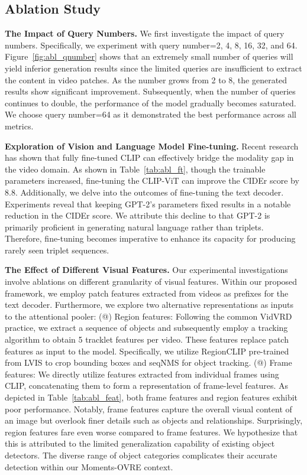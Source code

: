 \documentclass[letterpaper]{article}
\makeatletter
\newcommand{\Rmnum}[1]{\expandafter\@slowromancap\romannumeral #1@}
\makeatother
\begin{document}
\subsection{Ablation Study}
\noindent \textbf{The Impact of Query Numbers. }
We first investigate the impact of query numbers.
Specifically, we experiment with query number=2, 4, 8, 16, 32, and 64.
Figure~\ref{fig:abl_qnumber} shows that an extremely small number of queries will yield inferior generation results since the limited queries are insufficient to extract the content in video patches.
As the number grows from 2 to 8, the generated results show significant improvement.
Subsequently, when the number of queries continues to double, the performance of the model gradually becomes saturated. We choose query number=64 as it demonstrated the best performance across all metrics.

\noindent \textbf{Exploration of Vision and Language Model Fine-tuning.}
Recent research~\cite{Rasheed2023vificlip} has shown that fully fine-tuned CLIP can effectively bridge the modality gap in the video domain.
As shown in Table~\ref{tab:abl_ft}, though the trainable parameters increased, fine-tuning the CLIP-ViT can improve the CIDEr score by 8.8.
Additionally, we delve into the outcomes of fine-tuning the text decoder. Experiments reveal that keeping GPT-2's parameters fixed results in a notable reduction in the CIDEr score. We attribute this decline to that GPT-2 is primarily proficient in generating natural language rather than triplets. Therefore, fine-tuning becomes imperative to enhance its capacity for producing rarely seen triplet sequences.

\noindent \textbf{The Effect of Different Visual Features.}
Our experimental investigations involve ablations on different granularity of visual features. Within our proposed framework, we employ patch features extracted from videos as prefixes for the text decoder. Furthermore, we explore two alternative representations as inputs to the attentional pooler:
\vspace{-1.66mm}
(\Rmnum{1}) Region features: Following the common VidVRD practice, we extract a sequence of objects and subsequently employ a tracking algorithm to obtain 5 tracklet features per video. These features replace patch features as input to the model. Specifically, we utilize RegionCLIP \cite{zhong2021regionclip} pre-trained from LVIS to crop bounding boxes and seqNMS \cite{han2016seqnms} for object tracking.
(\Rmnum{2}) Frame features: We directly utilize features extracted from individual frames using CLIP, concatenating them to form a representation of frame-level features.
As depicted in Table~\ref{tab:abl_feat}, both frame features and region features exhibit poor performance. Notably, frame features capture the overall visual content of an image but overlook finer details such as objects and relationships. Surprisingly, region features fare even worse compared to frame features. We hypothesize that this is attributed to the limited generalization capability of existing object detectors. The diverse range of object categories complicates their accurate detection within our Moments-OVRE context.
\end{document}
